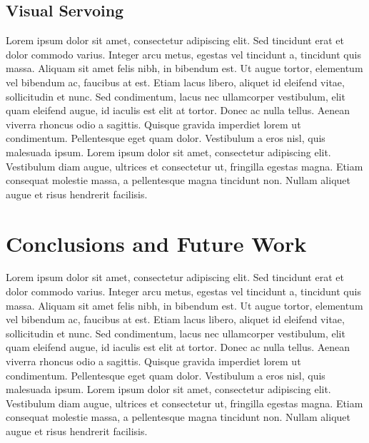 \documentclass[letterpaper, 10 pt, conference]{ieeeconf}
\begin{document}
\subsection{Visual Servoing}
Lorem ipsum dolor sit amet, consectetur adipiscing elit. Sed tincidunt erat et dolor commodo varius. Integer arcu metus, egestas vel tincidunt a, tincidunt quis massa. Aliquam sit amet felis nibh, in bibendum est. Ut augue tortor, elementum vel bibendum ac, faucibus at est. Etiam lacus libero, aliquet id eleifend vitae, sollicitudin et nunc. Sed condimentum, lacus nec ullamcorper vestibulum, elit quam eleifend augue, id iaculis est elit at tortor. Donec ac nulla tellus. Aenean viverra rhoncus odio a sagittis. Quisque gravida imperdiet lorem ut condimentum. Pellentesque eget quam dolor. Vestibulum a eros nisl, quis malesuada ipsum. Lorem ipsum dolor sit amet, consectetur adipiscing elit. Vestibulum diam augue, ultrices et consectetur ut, fringilla egestas magna. Etiam consequat molestie massa, a pellentesque magna tincidunt non. Nullam aliquet augue et risus hendrerit facilisis.

\addtolength{\textheight}{-0cm}


\section{Conclusions and Future Work}
Lorem ipsum dolor sit amet, consectetur adipiscing elit. Sed tincidunt erat et dolor commodo varius. Integer arcu metus, egestas vel tincidunt a, tincidunt quis massa. Aliquam sit amet felis nibh, in bibendum est. Ut augue tortor, elementum vel bibendum ac, faucibus at est. Etiam lacus libero, aliquet id eleifend vitae, sollicitudin et nunc. Sed condimentum, lacus nec ullamcorper vestibulum, elit quam eleifend augue, id iaculis est elit at tortor. Donec ac nulla tellus. Aenean viverra rhoncus odio a sagittis. Quisque gravida imperdiet lorem ut condimentum. Pellentesque eget quam dolor. Vestibulum a eros nisl, quis malesuada ipsum. Lorem ipsum dolor sit amet, consectetur adipiscing elit. Vestibulum diam augue, ultrices et consectetur ut, fringilla egestas magna. Etiam consequat molestie massa, a pellentesque magna tincidunt non. Nullam aliquet augue et risus hendrerit facilisis.
\end{document}
